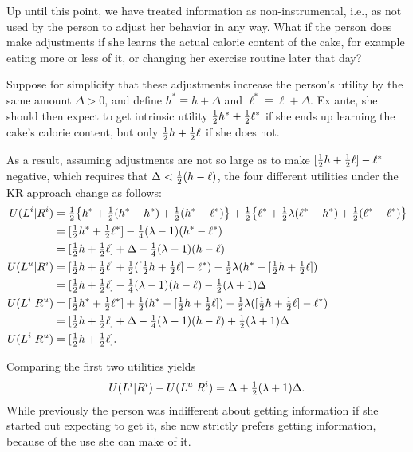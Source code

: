 Up until this point, we have treated information as non-instrumental, i.e., as not used by the person to adjust her behavior in any way. What if the person does make adjustments if she learns the actual calorie content of the cake, for example eating more or less of it, or changing her exercise routine later that day?

Suppose for simplicity that these adjustments increase the person's utility by the same amount $\Delta>0$, and define $h^* \equiv h+\Delta$ and $\ell^* \equiv \ell + \Delta$. Ex ante, she should then expect to get intrinsic utility $\tfrac{1}{2} h^* + \tfrac{1}{2} \ell^*$ if she ends up learning the cake's calorie content, but only $\tfrac{1}{2} h + \tfrac{1}{2} \ell$ if she does not.

As a result, assuming adjustments are not so large as to make $[\tfrac{1}{2} h + \tfrac{1}{2} \ell]-\ell^*$ negative, which requires that $\Delta<\tfrac{1}{2} (h-\ell)$, the four different utilities under the KR approach change as follows:
\begin{align*}
  U(L^i|R^i)
    &= \tfrac{1}{2} \bigl\{h^* + \tfrac{1}{2} (h^*-h^*) + \tfrac{1}{2} (h^* - \ell^*)\bigr\} +
       \tfrac{1}{2} \bigl\{\ell^* + \tfrac{1}{2} \lambda (\ell^*-h^*) + \tfrac{1}{2} (\ell^*-\ell^*)\bigr\}
    \\
    &= [\tfrac{1}{2} h^* + \tfrac{1}{2} \ell^*] - \tfrac{1}{4} (\lambda - 1)(h^*-\ell^*)
    \\
    &= [\tfrac{1}{2} h + \tfrac{1}{2} \ell] + \Delta - \tfrac{1}{4} (\lambda-1)(h-\ell)
    \\
  U(L^u|R^i)
    &= [\tfrac{1}{2} h + \tfrac{1}{2} \ell] + \tfrac{1}{2} ([\tfrac{1}{2} h + \tfrac{1}{2} \ell] - \ell^*) -
    \tfrac{1}{2} \lambda (h^*-[\tfrac{1}{2} h + \tfrac{1}{2} \ell])
    \\
    &= [\tfrac{1}{2} h + \tfrac{1}{2} \ell] - \tfrac{1}{4} (\lambda - 1)(h-\ell)-
    \tfrac{1}{2}(\lambda+1)\Delta
    \\
  U(L^i|R^u)
    &= [\tfrac{1}{2} h^* + \tfrac{1}{2} \ell^*] + \tfrac{1}{2} (h^* - [\tfrac{1}{2} h + \tfrac{1}{2} \ell]) -
    \tfrac{1}{2} \lambda ([\tfrac{1}{2} h + \tfrac{1}{2} \ell] - \ell^*)
    \\
    &= [\tfrac{1}{2} h + \tfrac{1}{2} \ell] + \Delta - \tfrac{1}{4}(\lambda-1)(h-\ell)+
    \tfrac{1}{2} (\lambda + 1)\Delta
    \\
  U(L^i|R^u)
    &= [\tfrac{1}{2} h + \tfrac{1}{2} \ell].
\end{align*}

Comparing the first two utilities yields
\begin{equation*}
  U(L^i|R^i) - U(L^u|R^i) = \Delta + \tfrac{1}{2} (\lambda+1)\Delta.
\end{equation*}
While previously the person was indifferent about getting information if she started out expecting to get it, she now strictly prefers getting information, because of the use she can make of it.

